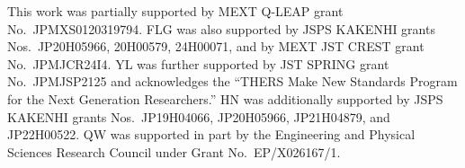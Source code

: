 \documentclass[11pt, a4paper]{article}
\numberwithin{equation}{section}
\numberwithin{figure}{section}
\begin{document}
This work was partially supported by MEXT Q-LEAP grant No.~\mbox{JPMXS0120319794}. 
FLG was also supported by JSPS KAKENHI grants Nos.~\mbox{JP20H05966}, \mbox{20H00579}, \mbox{24H00071}, and by MEXT JST CREST grant No.~\mbox{JPMJCR24I4}. 
YL was further supported by JST SPRING grant No.~\mbox{JPMJSP2125} and acknowledges the ``THERS Make New Standards Program for the Next Generation Researchers.''
HN was additionally supported by JSPS KAKENHI grants Nos.~\mbox{JP19H04066}, \mbox{JP20H05966}, \mbox{JP21H04879}, and \mbox{JP22H00522}.
QW was supported in part by the Engineering and Physical Sciences Research Council under Grant No.~\mbox{EP/X026167/1}. 




\end{document}
